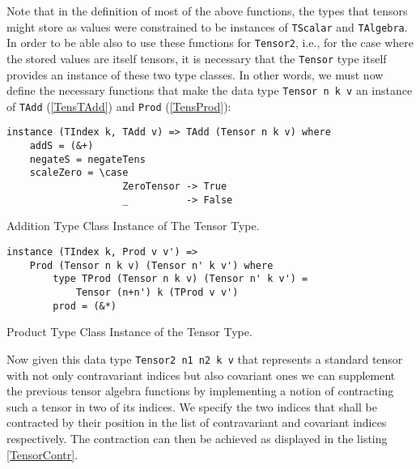 Note that in the definition of most of the above functions, the types that tensors might store as values were constrained to be instances of \texttt{TScalar} and \texttt{TAlgebra}. 
In order to be able also to use these functions for  \texttt{Tensor2}, i.e., for the case where the stored values are itself tensors, it is necessary that the \texttt{Tensor} type itself provides an instance of these two type classes. In other words, we must now define the necessary functions that make the data type
\texttt{Tensor n k v} an instance of \texttt{TAdd} (\ref{TensTAdd}) and \texttt{Prod} (\ref{TensProd}):

\begin{listing}[hbt!] 
\begin{verbatim}
instance (TIndex k, TAdd v) => TAdd (Tensor n k v) where
    addS = (&+)
    negateS = negateTens
    scaleZero = \case
                    ZeroTensor -> True
                    _          -> False
\end{verbatim}
\caption{Addition Type Class Instance of The Tensor Type.}\label{TensTAdd}
\end{listing}

\begin{listing}[hbt!]
\begin{verbatim}
instance (TIndex k, Prod v v') => 
    Prod (Tensor n k v) (Tensor n' k v') where
        type TProd (Tensor n k v) (Tensor n' k v') = 
            Tensor (n+n') k (TProd v v')
        prod = (&*)
\end{verbatim} 
\caption{Product Type Class Instance of the Tensor Type.}\label{TensProd}
\end{listing}

Now given this data type \texttt{Tensor2 n1 n2 k v} that represents a standard tensor with not only contravariant indices but also covariant ones we can supplement the previous tensor algebra functions by implementing a notion of contracting such a tensor in two of its indices.
We specify the two indices that shall be contracted by their position in the list of contravariant and covariant indices respectively. The contraction can then be achieved as displayed in the listing \ref{TensorContr}.

